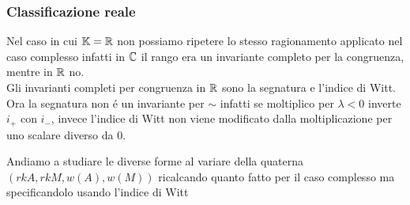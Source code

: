 \subsubsection{Classificazione reale}
\begin{oss}
Nel caso in cui $\mathbb{K}=\mathbb{R}$ non possiamo ripetere lo stesso ragionamento applicato nel caso complesso infatti in $\mathbb{C}$ il rango era un invariante completo per la congruenza, mentre in $\mathbb{R}$ no.\\
Gli invarianti completi per congruenza in $\mathbb{R}$ sono la segnatura e l'indice di Witt.\\
Ora la segnatura non \'e un invariante per $\sim$ infatti se moltiplico per $\lambda<0$ inverte $i_+ $ con $i_-$, invece l'indice di Witt non  viene modificato dalla moltiplicazione per uno scalare diverso da $0$.\\

\end{oss}
Andiamo a studiare le diverse forme al variare della quaterna $(rk A, rk M , w (A), w (M) )$ ricalcando quanto fatto per il caso complesso ma specificandolo usando l'indice di Witt
